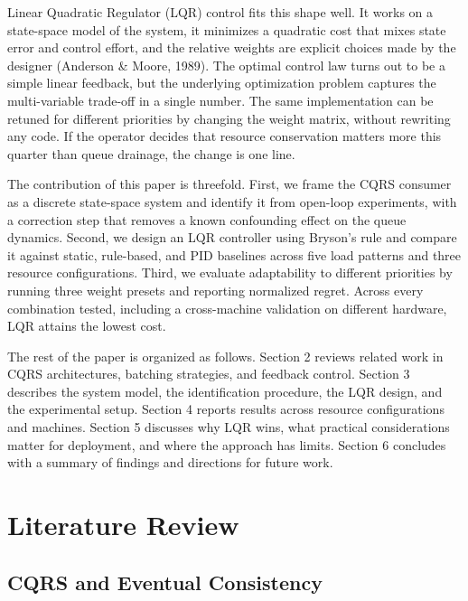 \documentclass[10pt,a4paper]{article}
\begin{document}
Linear Quadratic Regulator (LQR) control fits this shape well. It works on a state-space model of the system, it minimizes a quadratic cost that mixes state error and control effort, and the relative weights are explicit choices made by the designer (Anderson \& Moore, 1989). The optimal control law turns out to be a simple linear feedback, but the underlying optimization problem captures the multi-variable trade-off in a single number. The same implementation can be retuned for different priorities by changing the weight matrix, without rewriting any code. If the operator decides that resource conservation matters more this quarter than queue drainage, the change is one line.

The contribution of this paper is threefold. First, we frame the CQRS consumer as a discrete state-space system and identify it from open-loop experiments, with a correction step that removes a known confounding effect on the queue dynamics. Second, we design an LQR controller using Bryson's rule and compare it against static, rule-based, and PID baselines across five load patterns and three resource configurations. Third, we evaluate adaptability to different priorities by running three weight presets and reporting normalized regret. Across every combination tested, including a cross-machine validation on different hardware, LQR attains the lowest cost.

The rest of the paper is organized as follows. Section 2 reviews related work in CQRS architectures, batching strategies, and feedback control. Section 3 describes the system model, the identification procedure, the LQR design, and the experimental setup. Section 4 reports results across resource configurations and machines. Section 5 discusses why LQR wins, what practical considerations matter for deployment, and where the approach has limits. Section 6 concludes with a summary of findings and directions for future work.

\section{Literature Review}

\subsection{CQRS and Eventual Consistency}
\end{document}
